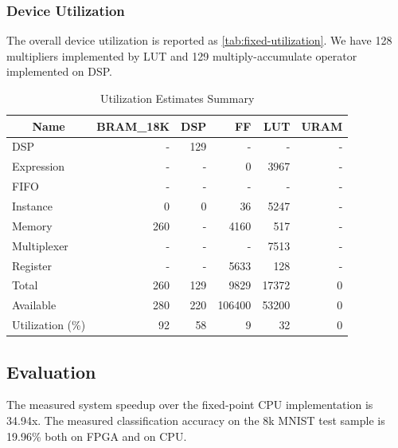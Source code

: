 \subsubsection{Device Utilization}

The overall device utilization is reported as \autoref{tab:fixed-utilization}.
We have 128 multipliers implemented by LUT and 129 multiply-accumulate operator implemented on DSP.

\begin{table}[ht!]
    \centering
    \caption{Utilization Estimates Summary}\label{tab:fixed-utilization}
    \begin{tabular}{lrrrrr}
        \toprule
        \multicolumn{1}{c}{Name} & BRAM\_18K & DSP & FF     & LUT   & URAM \\
        \midrule
        DSP                      & -         & 129 & -      & -     & -    \\
        Expression               & -         & -   & 0      & 3967  & -    \\
        FIFO                     & -         & -   & -      & -     & -    \\
        Instance                 & 0         & 0   & 36     & 5247  & -    \\
        Memory                   & 260       & -   & 4160   & 517   & -    \\
        Multiplexer              & -         & -   & -      & 7513  & -    \\
        Register                 & -         & -   & 5633   & 128   & -    \\
        \midrule
        Total                    & 260       & 129 & 9829   & 17372 & 0    \\
        \midrule
        Available                & 280       & 220 & 106400 & 53200 & 0    \\
        \midrule
        Utilization (\%)         & 92        & 58  & 9      & 32    & 0    \\
        \bottomrule
    \end{tabular}
\end{table}


\subsection{Evaluation}

The measured system speedup over the fixed-point CPU implementation is 34.94x.
The measured classification accuracy on the 8k MNIST test sample is 19.96\% both on FPGA and on CPU.


